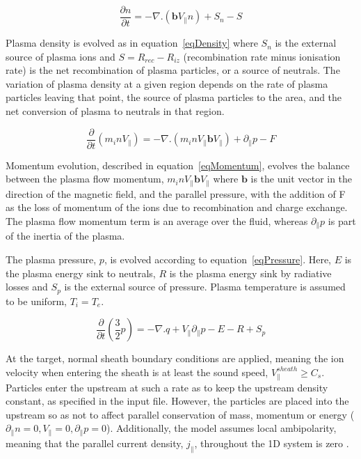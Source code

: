 \documentclass[12pt]{article}  %
\begin{document}
  \begin{equation}\label{eqDensity}
  \frac{\partial n}{\partial t} = -\nabla . (\textbf{b}V_{\parallel}n) + S_n - S
  \end{equation}

Plasma density is evolved as in equation~\ref{eqDensity} where $S_n$ is the external source of plasma ions and $S=R_{rec} - R_{iz}$ (recombination rate minus ionisation rate) is the net recombination of plasma particles, or a source of neutrals. The variation of plasma density at a given region depends on the rate of plasma particles leaving that point, the source of plasma particles to the area, and the net conversion of plasma to neutrals in that region.

  \begin{equation}\label{eqMomentum}
  \frac{\partial}{\partial t}(m_i n V_{\parallel}) = -\nabla . (m_i n V_{\parallel} \textbf{b} V_{\parallel}) + \partial_{\parallel}p - F
  \end{equation}

Momentum evolution, described in equation~\ref{eqMomentum}, evolves the balance between the plasma flow momentum, $m_inV_{\parallel}\textbf{b}V_{\parallel}$ where $\textbf{b}$ is the unit vector in the direction of the magnetic field, and the parallel pressure, with the addition of F as the loss of momentum of the ions due to recombination and charge exchange. The plasma flow momentum term is an average over the fluid, whereas $\partial_{\parallel}p$ is part of the inertia of the plasma.

The plasma pressure, $ p $, is evolved according to equation~\ref{eqPressure}. Here, $ E $ is the plasma energy sink to neutrals, $ R $ is the plasma energy sink by radiative losses and $ S_p $ is the external source of pressure. Plasma temperature is assumed to be uniform, $ T_i = T_e $.

  \begin{equation}\label{eqPressure}
  \frac{\partial}{\partial t}\left( \frac{3}{2}p\right)  = -\nabla.q + V_{\parallel} \partial_{\parallel}p -E - R + S_p
  \end{equation}


At the target, normal sheath boundary conditions are applied, meaning the ion velocity when entering the sheath is at least the sound speed, $ V_{\parallel}^{sheath} \geq C_s$. Particles enter the upstream at such a rate as to keep the upstream density constant, as specified in the input file. However, the particles are placed into the upstream so as not to affect parallel conservation of mass, momentum or energy ($ \partial_{\parallel}n =0, V_{\parallel} =0, \partial_{\parallel}p =0 $). Additionally, the model assumes local ambipolarity, meaning that the parallel current density, $j_{\parallel}$, throughout the 1D system is zero \cite{Stangeby}. 
\end{document}
